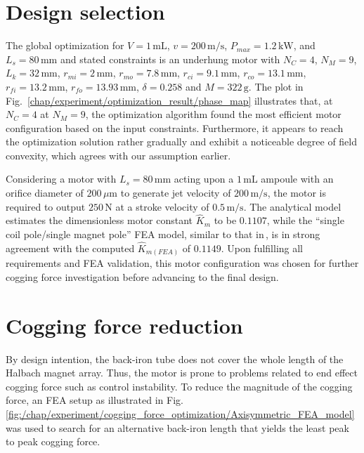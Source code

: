 \section{Design selection}                          \label{Chapter:experiment/design selection}


    The global optimization for $V = 1\,\mathrm{mL}$, $v = 200\,\mathrm{m/s}$, $P_{max} = 1.2\,\mathrm{kW}$, and $L_s = 80\,\mathrm{mm}$ and stated constraints is an underhung motor with $N_C = 4$, $N_M = 9$, $L_k = 32\,\mathrm{mm}$, $r_{mi} = 2\,\mathrm{mm}$, $r_{mo} = 7.8\,\mathrm{mm}$, $r_{ci} = 9.1\,\mathrm{mm}$, $r_{co} = 13.1\,\mathrm{mm}$, $r_{fi} = 13.2\,\mathrm{mm}$, $r_{fo} = 13.93\,\mathrm{mm}$, $\delta = 0.258$ and $M = 322\,\mathrm{g}$. The plot in Fig.~\ref{chap/experiment/optimization_result/phase_map} illustrates that, at $N_C = 4$ at $N_M = 9$, the optimization algorithm found the most efficient motor configuration based on the input constraints. Furthermore, it appears to reach the optimization solution rather gradually and exhibit a noticeable degree of field convexity, which agrees with our assumption earlier.
    
    Considering a motor with $L_s = 80\,\mathrm{mm}$ acting upon a $1\,\mathrm{mL}$ ampoule with an orifice diameter of $200\,\mu \mathrm{m}$ to generate jet velocity of $200\,\mathrm{m/s}$, the motor is required to output $250\,\mathrm{N}$ at a stroke velocity of $0.5\,\mathrm{m/s}$. The analytical model estimates the dimensionless motor constant $\hat{K}_m$ to be $0.1107$, while the “single coil pole/single magnet pole” \acs{FEA} model, similar to that in\,\cite{Ruddy2011a}, is in strong agreement with the computed $\hat{K}_{m(FEA)}$ of $0.1149$. Upon fulfilling all requirements and \acs{FEA} validation, this motor configuration was chosen for further cogging force investigation before advancing to the final design.


\section{Cogging force reduction}                   \label{Chapter:experiment/cogging reduction}


    By design intention, the back-iron tube does not cover the whole length of the Halbach magnet array. Thus, the motor is prone to problems related to end effect cogging force such as control instability. To reduce the magnitude of the cogging force, an \acs{FEA} setup as illustrated in Fig.\,\ref{fig:/chap/experiment/cogging_force_optimization/Axisymmetric_FEA_model} was used to search for an alternative back-iron length that yields the least peak to peak cogging force. 
    
